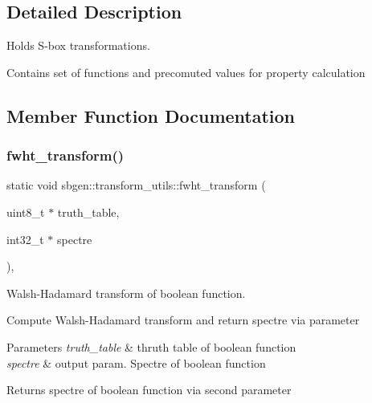 \subsection{Detailed Description}
Holds S-\/box transformations. 

Contains set of functions and precomuted values for property calculation 

\subsection{Member Function Documentation}
\mbox{\label{classsbgen_1_1transform__utils_a764bf170fd2350216aff391a7387580c}} 
\subsubsection{\texorpdfstring{fwht\+\_\+transform()}{fwht\_transform()}}
{\footnotesize\ttfamily static void sbgen\+::transform\+\_\+utils\+::fwht\+\_\+transform (\begin{DoxyParamCaption}\item[{uint8\+\_\+t $\ast$}]{truth\+\_\+table,  }\item[{int32\+\_\+t $\ast$}]{spectre }\end{DoxyParamCaption})\hspace{0.3cm}{\ttfamily [inline]}, {\ttfamily [static]}}



Walsh-\/\+Hadamard transform of boolean function. 

Compute Walsh-\/\+Hadamard transform and return spectre via parameter


\begin{DoxyParams}{Parameters}
{\em truth\+\_\+table} & thruth table of boolean function \\
\hline
{\em spectre} & output param. Spectre of boolean function \\
\hline
\end{DoxyParams}
\begin{DoxyReturn}{Returns}
spectre of boolean function via second parameter 
\end{DoxyReturn}
\mbox{\label{classsbgen_1_1transform__utils_a4a2636f84e59ec0dff2418233d9ec79f}} 
